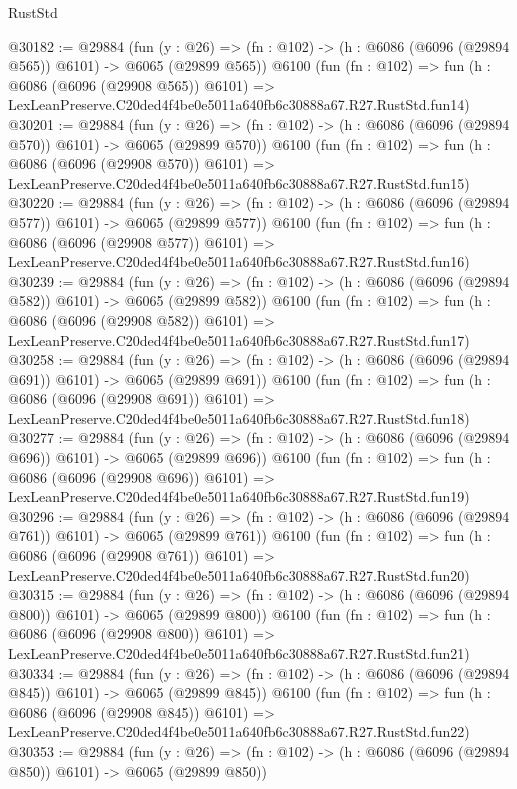 \begin{lexlean}{RustStd}
\begin{coremodule}
@30182 := @29884
    (fun (y : @26) => (fn : @102) -> (h : @6086 (@6096 (@29894 @565)) @6101) -> @6065 (@29899 @565))
    @6100
    (fun (fn : @102) =>
    fun (h : @6086 (@6096 (@29908 @565)) @6101) =>
    LexLeanPreserve.C20ded4f4be0e5011a640fb6c30888a67.R27.RustStd.fun14)
@30201 := @29884
    (fun (y : @26) => (fn : @102) -> (h : @6086 (@6096 (@29894 @570)) @6101) -> @6065 (@29899 @570))
    @6100
    (fun (fn : @102) =>
    fun (h : @6086 (@6096 (@29908 @570)) @6101) =>
    LexLeanPreserve.C20ded4f4be0e5011a640fb6c30888a67.R27.RustStd.fun15)
@30220 := @29884
    (fun (y : @26) => (fn : @102) -> (h : @6086 (@6096 (@29894 @577)) @6101) -> @6065 (@29899 @577))
    @6100
    (fun (fn : @102) =>
    fun (h : @6086 (@6096 (@29908 @577)) @6101) =>
    LexLeanPreserve.C20ded4f4be0e5011a640fb6c30888a67.R27.RustStd.fun16)
@30239 := @29884
    (fun (y : @26) => (fn : @102) -> (h : @6086 (@6096 (@29894 @582)) @6101) -> @6065 (@29899 @582))
    @6100
    (fun (fn : @102) =>
    fun (h : @6086 (@6096 (@29908 @582)) @6101) =>
    LexLeanPreserve.C20ded4f4be0e5011a640fb6c30888a67.R27.RustStd.fun17)
@30258 := @29884
    (fun (y : @26) => (fn : @102) -> (h : @6086 (@6096 (@29894 @691)) @6101) -> @6065 (@29899 @691))
    @6100
    (fun (fn : @102) =>
    fun (h : @6086 (@6096 (@29908 @691)) @6101) =>
    LexLeanPreserve.C20ded4f4be0e5011a640fb6c30888a67.R27.RustStd.fun18)
@30277 := @29884
    (fun (y : @26) => (fn : @102) -> (h : @6086 (@6096 (@29894 @696)) @6101) -> @6065 (@29899 @696))
    @6100
    (fun (fn : @102) =>
    fun (h : @6086 (@6096 (@29908 @696)) @6101) =>
    LexLeanPreserve.C20ded4f4be0e5011a640fb6c30888a67.R27.RustStd.fun19)
@30296 := @29884
    (fun (y : @26) => (fn : @102) -> (h : @6086 (@6096 (@29894 @761)) @6101) -> @6065 (@29899 @761))
    @6100
    (fun (fn : @102) =>
    fun (h : @6086 (@6096 (@29908 @761)) @6101) =>
    LexLeanPreserve.C20ded4f4be0e5011a640fb6c30888a67.R27.RustStd.fun20)
@30315 := @29884
    (fun (y : @26) => (fn : @102) -> (h : @6086 (@6096 (@29894 @800)) @6101) -> @6065 (@29899 @800))
    @6100
    (fun (fn : @102) =>
    fun (h : @6086 (@6096 (@29908 @800)) @6101) =>
    LexLeanPreserve.C20ded4f4be0e5011a640fb6c30888a67.R27.RustStd.fun21)
@30334 := @29884
    (fun (y : @26) => (fn : @102) -> (h : @6086 (@6096 (@29894 @845)) @6101) -> @6065 (@29899 @845))
    @6100
    (fun (fn : @102) =>
    fun (h : @6086 (@6096 (@29908 @845)) @6101) =>
    LexLeanPreserve.C20ded4f4be0e5011a640fb6c30888a67.R27.RustStd.fun22)
@30353 := @29884
    (fun (y : @26) => (fn : @102) -> (h : @6086 (@6096 (@29894 @850)) @6101) -> @6065 (@29899 @850))

\end{coremodule}
\end{lexlean}
